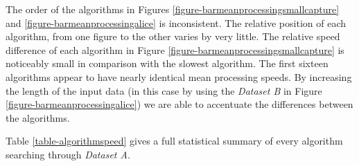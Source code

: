 \documentclass[9pt, conference]{IEEEtran}
\begin{document}
The order of the algorithms in Figures \ref{figure-barmeanprocessingsmallcapture} and \ref{figure-barmeanprocessingalice} is inconsistent. The relative position of each algorithm, from one figure to the other varies by very little. The relative speed difference of each algorithm in Figure \ref{figure-barmeanprocessingsmallcapture} is noticeably small in comparison with the slowest algorithm. The first sixteen algorithms appear to have nearly identical mean processing speeds. By increasing the length of the input data (in this case by using the \textit{Dataset B} in Figure \ref{figure-barmeanprocessingalice}) we are able to accentuate the differences between the algorithms.

Table \ref{table-algorithmspeed} gives a full statistical summary of every algorithm searching through \textit{Dataset A}.\\
\end{document}
